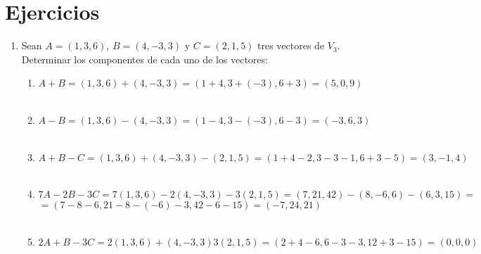 \section{Ejercicios}
\begin{enumerate}

\item Sean $A=(1,3,6)$, $B=(4,-3,3)$ y $C=(2,1,5)$ tres vectores de $V_3$. Determinar los componentes de cada uno de los vectores: 
\begin{enumerate}[\bfseries a)]

    \item $A+B = (1,3,6) + (4,-3,3) = (1+4,3+(-3),6+3) = (5,0,9)$\\\\

    \item $A-B = (1,3,6) - (4,-3,3) = (1-4,3-(-3),6-3) = (-3,6,3)$\\\\

    \item $A+B-C = (1,3,6)+(4,-3,3)-(2,1,5) = (1+4-2,3-3-1,6+3-5) = (3,-1,4)$\\\\

    \item $7A-2B-3C = 7(1,3,6)-2(4,-3,3)-3(2,1,5) = (7,21,42)-(8,-6,6)-(6,3,15) =$\\ $=(7-8-6,21-8-(-6)-3,42-6-15) = (-7,24,21)$\\\\

    \item $2A+B-3C = 2(1,3,6) + (4,-3,3) 3(2,1,5) = (2+4-6,6-3-3,12+3-15) = (0,0,0)$\\\\

\end{enumerate}


\end{enumerate}
